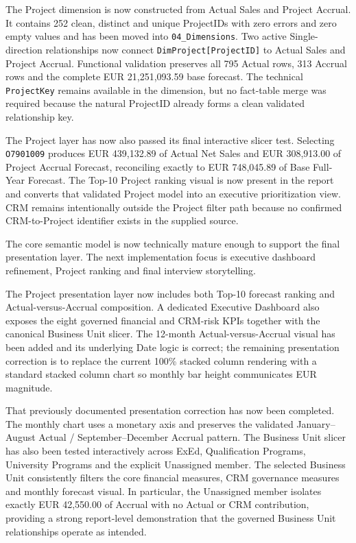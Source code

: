 \documentclass[11pt,a4paper]{article}
\begin{document}
\begin{summarybox}
The Project dimension is now constructed from Actual Sales and Project Accrual.
It contains 252 clean, distinct and unique ProjectIDs with zero errors and zero
empty values and has been moved into \texttt{04\_Dimensions}. Two active
Single-direction relationships now connect \texttt{DimProject[ProjectID]} to
Actual Sales and Project Accrual. Functional validation preserves all 795 Actual
rows, 313 Accrual rows and the complete EUR 21,251,093.59 base forecast. The
technical \texttt{ProjectKey} remains available in the dimension, but no fact-table
merge was required because the natural ProjectID already forms a clean validated
relationship key.

The Project layer has now also passed its final interactive slicer test. Selecting
\texttt{O7901009} produces EUR 439,132.89 of Actual Net Sales and EUR 308,913.00
of Project Accrual Forecast, reconciling exactly to EUR 748,045.89 of Base Full-Year
Forecast. The Top-10 Project ranking visual is now present in the report and converts
that validated Project model into an executive prioritization view. CRM remains
intentionally outside the Project filter path because no confirmed CRM-to-Project
identifier exists in the supplied source.

The core semantic model is now technically mature enough to support the final
presentation layer. The next implementation focus is executive dashboard refinement,
Project ranking and final interview storytelling.

The Project presentation layer now includes both Top-10 forecast ranking and
Actual-versus-Accrual composition. A dedicated Executive Dashboard also exposes
the eight governed financial and CRM-risk KPIs together with the canonical
Business Unit slicer. The 12-month Actual-versus-Accrual visual has been added and
its underlying Date logic is correct; the remaining presentation correction is to
replace the current 100\% stacked column rendering with a standard stacked column
chart so monthly bar height communicates EUR magnitude.

That previously documented presentation correction has now been completed. The
monthly chart uses a monetary axis and preserves the validated January--August
Actual / September--December Accrual pattern. The Business Unit slicer has also
been tested interactively across ExEd, Qualification Programs, University Programs
and the explicit Unassigned member. The selected Business Unit consistently filters
the core financial measures, CRM governance measures and monthly forecast visual.
In particular, the Unassigned member isolates exactly EUR 42,550.00 of Accrual
with no Actual or CRM contribution, providing a strong report-level demonstration
that the governed Business Unit relationships operate as intended.



\end{summarybox}
\end{document}
